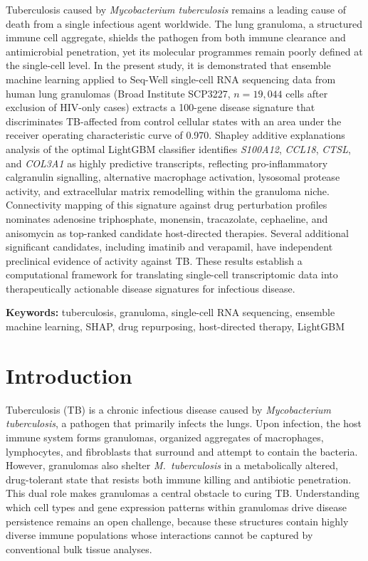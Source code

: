 \documentclass[12pt]{article}
\begin{document}
Tuberculosis caused by \textit{Mycobacterium tuberculosis} remains a leading cause of death from a single infectious agent worldwide. The lung granuloma, a structured immune cell aggregate, shields the pathogen from both immune clearance and antimicrobial penetration, yet its molecular programmes remain poorly defined at the single-cell level. In the present study, it is demonstrated that ensemble machine learning applied to Seq-Well single-cell RNA sequencing data from human lung granulomas (Broad Institute SCP3227, $n = 19{,}044$ cells after exclusion of HIV-only cases) extracts a 100-gene disease signature that discriminates TB-affected from control cellular states with an area under the receiver operating characteristic curve of 0.970. Shapley additive explanations analysis of the optimal LightGBM classifier identifies \textit{S100A12}, \textit{CCL18}, \textit{CTSL}, and \textit{COL3A1} as highly predictive transcripts, reflecting pro-inflammatory calgranulin signalling, alternative macrophage activation, lysosomal protease activity, and extracellular matrix remodelling within the granuloma niche. Connectivity mapping of this signature against drug perturbation profiles nominates adenosine triphosphate, monensin, tracazolate, cephaeline, and anisomycin as top-ranked candidate host-directed therapies. Several additional significant candidates, including imatinib and verapamil, have independent preclinical evidence of activity against TB. These results establish a computational framework for translating single-cell transcriptomic data into therapeutically actionable disease signatures for infectious disease.

\noindent\textbf{Keywords:} tuberculosis, granuloma, single-cell RNA sequencing, ensemble machine learning, SHAP, drug repurposing, host-directed therapy, LightGBM

\section*{Introduction}

Tuberculosis (TB) is a chronic infectious disease caused by \textit{Mycobacterium tuberculosis}, a pathogen that primarily infects the lungs\cite{ramakrishnan2012}. Upon infection, the host immune system forms granulomas, organized aggregates of macrophages, lymphocytes, and fibroblasts that surround and attempt to contain the bacteria\cite{flynn2011}. However, granulomas also shelter \textit{M.~tuberculosis} in a metabolically altered, drug-tolerant state that resists both immune killing and antibiotic penetration\cite{ernst2012}. This dual role makes granulomas a central obstacle to curing TB. Understanding which cell types and gene expression patterns within granulomas drive disease persistence remains an open challenge, because these structures contain highly diverse immune populations whose interactions cannot be captured by conventional bulk tissue analyses.
\end{document}
